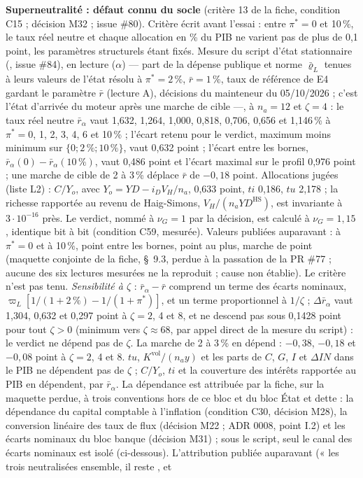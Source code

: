 \documentclass[11pt,a4paper]{article}
\newcommand{\code}[1]{\texttt{\detokenize{#1}}}
\newcommand{\barre}[1]{\leavevmode\sbox{\boitebarre}{#1}\rlap{\rule[0.6ex]{\wd\boitebarre}{0.4pt}}\usebox{\boitebarre}}
\begin{document}
\begin{proposee}
\textbf{Superneutralité : défaut connu du socle} (critère 13 de la fiche, condition C15 ; décision M32 ; issue \#80). Critère écrit avant l'essai : entre $\pi^\ast = 0$ et 10\,\%, le taux réel neutre et chaque allocation en \% du PIB ne varient pas de plus de 0,1 point, les paramètres structurels étant fixés. Mesure du script d'état stationnaire (\code{outils/etat_stationnaire.py}, issue \#84), en lecture ($\alpha$) --- part de la dépense publique et norme $\bar\varrho_L$ tenues à leurs valeurs de l'état résolu à $\pi^\ast = 2\,\%$, $\bar r = 1\,\%$, taux de référence de E4 gardant le paramètre $\bar r$ (lecture A), décisions du mainteneur du 05/10/2026 ; c'est l'état d'arrivée du moteur après une marche de cible ---, à $n_a = 12$ et $\zeta = 4$ : le taux réel neutre $\bar r_\alpha$ vaut 1,632, 1,264, 1,000, 0,818, 0,706, 0,656 et 1,146\,\% à $\pi^\ast = 0$, 1, 2, 3, 4, 6 et 10\,\% ; l'écart retenu pour le verdict, maximum moins minimum sur $\{0 ; 2\,\% ; 10\,\%\}$, vaut 0,632 point ; l'écart entre les bornes, $\bar r_\alpha(0) - \bar r_\alpha(10\,\%)$, vaut 0,486 point et l'écart maximal sur le profil 0,976 point ; une marche de cible de 2 à 3\,\% déplace $\bar r$ de $-0{,}18$ point. Allocations jugées (liste L2) : $C/Y_o$, avec $Y_o = \mathit{YD} - i_D V_H/n_a$, 0,633 point, $\mathit{ti}$ 0,186, $\mathit{tu}$ 2,178 ; la richesse rapportée au revenu de Haig-Simons, $V_H/(n_a\mathit{YD}^{\mathrm{HS}})$, est invariante à $3 \cdot 10^{-16}$ près. Le verdict, nommé à $\nu_G = 1$ par la décision, est calculé à $\nu_G = 1{,}15$, identique bit à bit (condition C59, mesurée). Valeurs publiées auparavant : \barre{1,536\,\%} à $\pi^\ast = 0$ et \barre{1,075\,\%} à 10\,\%, \barre{0,461} point entre les bornes, \barre{0,74} point au plus, marche de \barre{$-0{,}12$} point (maquette conjointe de la fiche, \S~9.3, perdue à la passation de la PR \#77 ; aucune des six lectures mesurées ne la reproduit ; cause non établie). Le critère n'est pas tenu. \emph{Sensibilité à $\zeta$} : $\bar r_\alpha - \bar r$ comprend un terme des écarts nominaux, $\varpi_L[1/(1 + 2\,\%) - 1/(1 + \pi^\ast)]$, et un terme proportionnel à $1/\zeta$ ; $\Delta\bar r_\alpha$ vaut 1,304, 0,632 et 0,297 point à $\zeta = 2$, 4 et 8, et ne descend pas sous 0,1428 point pour tout $\zeta > 0$ (minimum vers $\zeta \approx 68$, par appel direct de la mesure du script) : le verdict ne dépend pas de $\zeta$. La marche de 2 à 3\,\% en dépend : $-0{,}38$, $-0{,}18$ et $-0{,}08$ point à $\zeta = 2$, 4 et 8. $\mathit{tu}$, $K^{\mathrm{vol}}/(n_a y)$ et les parts de $C$, $G$, $I$ et $\Delta\mathit{IN}$ dans le PIB ne dépendent pas de $\zeta$ ; $C/Y_o$, $\mathit{ti}$ et la couverture des intérêts rapportée au PIB en dépendent, par $\bar r_\alpha$. La dépendance est attribuée par la fiche, sur la maquette perdue, à trois conventions hors de ce bloc et du bloc État et dette : la dépendance du capital comptable à l'inflation (condition C30, décision M28), la conversion linéaire des taux de flux (décision M22 ; ADR 0008, point I.2) et les écarts nominaux du bloc banque (décision M31) ; sous le script, seul le canal des écarts nominaux est isolé (ci-dessous). L'attribution publiée auparavant (« les trois neutralisées ensemble, il reste \barre{0,019 point}, et 
\end{proposee}
\end{document}
